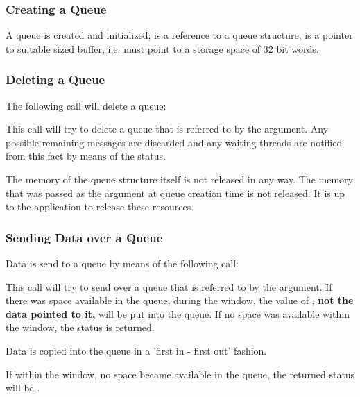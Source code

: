 \subsubsection{Creating a Queue}


A queue is created and initialized;  is a reference to a queue structure,
 is a pointer to suitable sized buffer, i.e.  must point to a storage space of
 32 bit words.

\subsubsection{Deleting a Queue}

The following call will delete a queue:


This call will try to delete a queue that is referred to by the  argument. 
Any possible remaining messages are discarded and any waiting threads are notified from
this fact by means of the  status.

The memory of the queue structure itself is not released in any way. The memory that was passed
as the  argument at queue creation time is not released. It is up to the application to release
these resources.

\subsubsection{Sending Data over a Queue}

Data is send to a queue by means of the following call:


This call will try to send  over a queue that is referred to by the
 argument. If there was space available in the queue, during the
 window, the value of , \textbf{not the data
pointed to it,} will be put into the queue. If no space was available within the
 window, the status  is returned. 

Data is copied into the queue in a 'first in - first out' fashion.

If within the  window, no space became available in the queue, the returned status will
be .

